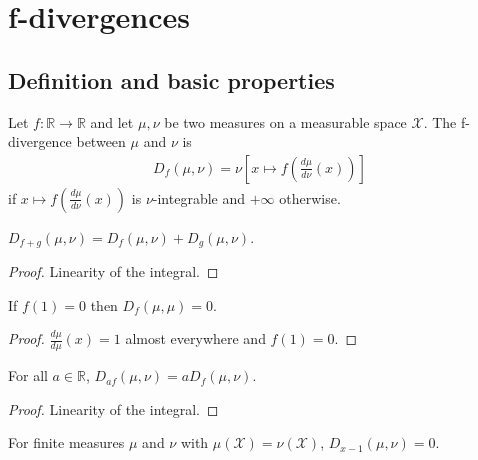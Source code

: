 \chapter{f-divergences}

\section{Definition and basic properties}

\begin{definition}[f-divergence]
  \label{def:fDiv}
  Let $f : \mathbb{R} \to \mathbb{R}$ and let $\mu, \nu$ be two measures on a measurable space $\mathcal X$. The f-divergence between $\mu$ and $\nu$ is
  \begin{align*}
  D_f(\mu, \nu) = \nu\left[x \mapsto f\left(\frac{d \mu}{d \nu}(x)\right)\right]
  \end{align*}
  if $x \mapsto f\left(\frac{d \mu}{d \nu}(x)\right)$ is $\nu$-integrable and $+\infty$ otherwise.
\end{definition}

\begin{lemma}
  \label{lem:fDiv_add}
  $D_{f + g}(\mu, \nu) = D_f(\mu, \nu) + D_g(\mu, \nu)$.
\end{lemma}

\begin{proof}
Linearity of the integral.
\end{proof}

\begin{lemma}
  \label{lem:fDiv_self}
  If $f(1) = 0$ then $D_{f}(\mu, \mu) = 0$.
\end{lemma}

\begin{proof}
$\frac{d \mu}{d \mu}(x) = 1$ almost everywhere and $f(1) = 0$.
\end{proof}

\begin{lemma}
  \label{lem:fDiv_mul}
  For all $a \in \mathbb{R}$, $D_{a f}(\mu, \nu) = a D_{f}(\mu, \nu)$.
\end{lemma}

\begin{proof}
Linearity of the integral.
\end{proof}

\begin{lemma}
  \label{lem:fDiv_linear}
  For finite measures $\mu$ and $\nu$ with $\mu(\mathcal X) = \nu(\mathcal X)$, $D_{x - 1}(\mu, \nu) = 0$.
\end{lemma}

